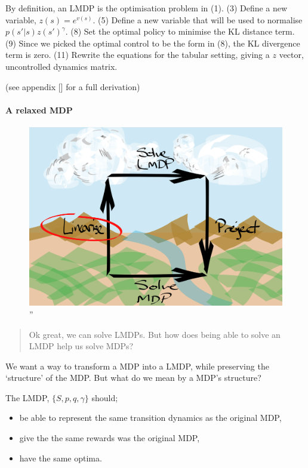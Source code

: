 By definition, an LMDP is the optimisation problem in (1). (3) Define a
new variable, \(z(s) = e^{v(s)}\). (5) Define a new variable that will
be used to normalise \(p(s' | s)z(s')^{\gamma}\). (8) Set the optimal
policy to minimise the KL distance term. (9) Since we picked the optimal
control to be the form in (8), the KL divergence term is zero. (11)
Rewrite the equations for the tabular setting, giving a \(z\) vector,
uncontrolled dynamics matrix.

(see appendix {[}{]} for a full derivation)

\hypertarget{a-relaxed-mdp}{%
\paragraph{A relaxed MDP}\label{a-relaxed-mdp}}

\begin{figure}
\centering
\includegraphics[width=4.6875in,height=\textheight]{../../pictures/drawings/abstract-representations-linear.png}
\caption{''}
\end{figure}

\begin{quote}
Ok great, we can solve LMDPs. But how does being able to solve an LMDP
help us solve MDPs?
\end{quote}

We want a way to transform a MDP into a LMDP, while preserving the
`structure' of the MDP. But what do we mean by a MDP's structure?

The LMDP, \(\{S, p, q, \gamma\}\) should;

\begin{itemize}
\tightlist
\item
  be able to represent the same transition dynamics as the original MDP,
\item
  give the the same rewards was the original MDP,
\item
  have the same optima.
\end{itemize}

